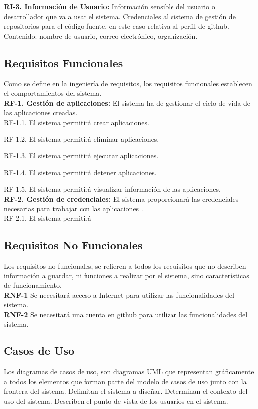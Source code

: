 \documentclass[a4paper,11pt]{book}
\begin{document}
\textbf{RI-3. Información de Usuario:} Información sensible del usuario o desarrollador que va a usar el sistema. Credenciales al sistema de gestión de repositorios para el código fuente, en este caso relativa al perfil de github. 
Contenido: nombre de usuario, correo electrónico, organización. \\


\subsection{Requisitos Funcionales }
Como se define en la ingeniería de requisitos, los requisitos funcionales establecen el comportamientos del sistema.\\

\textbf{RF-1. Gestión de aplicaciones:} El sistema ha de gestionar el ciclo de vida de las aplicaciones creadas.\\
   

	RF-1.1. El sistema permitirá crear aplicaciones.

	RF-1.2. El sistema permitirá eliminar aplicaciones.

	RF-1.3. El sistema permitirá ejecutar aplicaciones.

	RF-1.4. El sistema permitirá detener aplicaciones.

	RF-1.5. El sistema permitirá visualizar información de las aplicaciones.\\
	
\textbf{RF-2. Gestión de credenciales:} El sistema proporcionará las credenciales necesarias para trabajar con las aplicaciones .\\
   

	RF-2.1. El sistema permitirá 


\subsection{Requisitos No Funcionales }
Los requisitos no funcionales, se refieren a todos los requisitos que no describen información a guardar, ni funciones a realizar por el sistema, sino características de funcionamiento.\\


\textbf{RNF-1} Se necesitará acceso a Internet para utilizar las funcionalidades del sistema.\\
\textbf{RNF-2} Se necesitará una cuenta en github para utilizar las funcionalidades del sistema.\\


\subsection{Casos de Uso}
Los diagramas de casos de uso, son diagramas UML que representan gráficamente a todos los elementos que forman parte del modelo de casos de uso junto con la frontera del sistema. Delimitan el sistema a diseñar. Determinan el contexto del uso del sistema. Describen el punto de vista de los usuarios  en el sistema.
\end{document}
